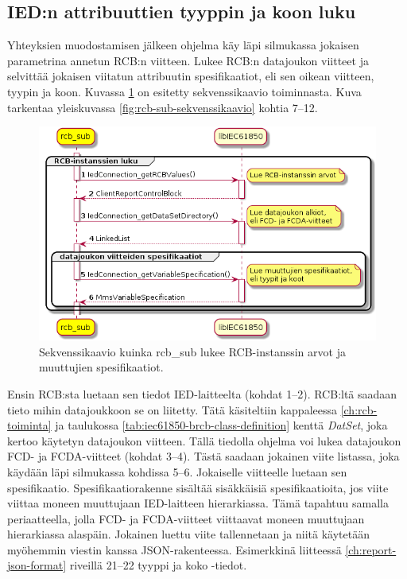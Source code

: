 \subsection{IED:n attribuuttien tyyppin ja koon luku}
Yhteyksien muodostamisen jälkeen ohjelma käy läpi silmukassa jokaisen parametrina annetun RCB:n viitteen. Lukee RCB:n datajoukon viitteet ja selvittää jokaisen viitatun attribuutin spesifikaatiot, eli sen oikean viitteen, tyypin ja koon. Kuvassa \ref{fig:rcb-sub-reading-specifications} on esitetty sekvenssikaavio toiminnasta. Kuva tarkentaa yleiskuvassa \ref{fig:rcb-sub-sekvenssikaavio} kohtia 7--12.

\begin{figure}[ht!]
	\includegraphics[width=1\textwidth]{pictures/rcb-sub-reading-specifications.png}
	\caption{Sekvenssikaavio kuinka rcb\_sub lukee RCB-instanssin arvot ja muuttujien spesifikaatiot.}
	\label{fig:rcb-sub-reading-specifications}
\end{figure}

Ensin RCB:sta luetaan sen tiedot IED-laitteelta (kohdat 1--2). RCB:ltä saadaan tieto mihin datajoukkoon se on liitetty. Tätä käsiteltiin kappaleessa \ref{ch:rcb-toiminta} ja taulukossa \ref{tab:iec61850-brcb-class-definition} kenttä \emph{DatSet}, joka kertoo käytetyn datajoukon viitteen. Tällä tiedolla ohjelma voi lukea datajoukon FCD- ja FCDA-viitteet (kohdat 3--4). Tästä saadaan jokainen viite listassa, joka käydään läpi silmukassa kohdissa 5--6. Jokaiselle viitteelle luetaan sen spesifikaatio. Spesifikaatiorakenne sisältää sisäkkäisiä spesifikaatioita, jos viite viittaa moneen muuttujaan IED-laitteen hierarkiassa. Tämä tapahtuu samalla periaatteella, jolla FCD- ja FCDA-viitteet viittaavat moneen muuttujaan hierarkiassa alaspäin. Jokainen luettu viite tallennetaan ja niitä käytetään myöhemmin viestin kanssa JSON-rakenteessa. Esimerkkinä liitteessä \ref{ch:report-json-format} riveillä 21--22 tyyppi ja koko -tiedot.



